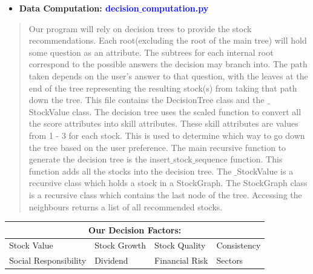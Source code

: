 \documentclass[fontsize=12pt]{article}
\begin{document}
\begin{itemize}
\item
  
  \textbf{Data Computation: \textcolor{blue}{decision$\_$computation.py}}
 
\end{itemize}
\begin{quote}
\noindent Our program will rely on decision trees to provide the stock recommendations. Each root(excluding the root of the main tree) will hold some question as an attribute. The subtrees for each internal root correspond to the possible answers the decision may branch into. The path taken depends on the user’s answer to that question, with the leaves at the end of the tree representing the resulting stock(s) from taking that path down the tree. This file contains the DecisionTree class and the $\_$StockValue class. The decision tree uses the scaled function to convert all the score attributes into skill attributes. These skill attributes are values from 1 - 3 for each stock. This is used to determine which way to go down the tree based on the user preference. The main recursive function to generate the decision tree is the insert$\_$stock$\_$sequence function. This function adds all the stocks into the decision tree. The $\_$StockValue is a recursive class which holds a stock in a StockGraph. The StockGraph class is a recursive class which contains the last node of the tree. Accessing the neighbours returns a list of all recommended stocks.

\end{quote}

\begin{center}
\begin{tabular}{ |p{3.5cm}|p{3.5cm}|p{3.5cm}|p{3.5cm}|}
 \hline
 \multicolumn{4}{|c|}{Our Decision Factors:} \\
 \hline
 Stock Value & Stock Growth & Stock Quality & Consistency\\
 \hline
 Social Responsibility & Dividend & Financial Risk & Sectors\\
 \hline
\end{tabular}
\end{center}
\end{document}
